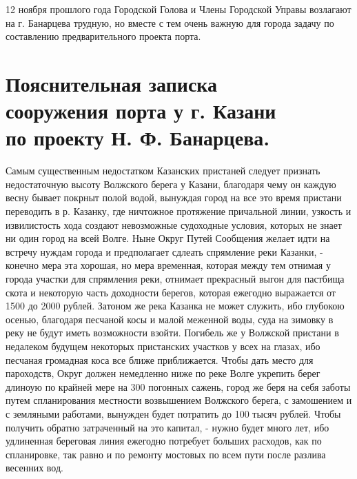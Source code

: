 \documentclass[oneside,final,14pt]{extreport}
\begin{document}
12 ноября прошлого года Городской Голова и Члены Городской Управы возлагают на г. Банарцева трудную, но вместе с тем очень важную для города задачу по составлению предварительного проекта порта.

\newpage

{%
	\centering
	\section*{Пояснительная записка \\сооружения порта у г. Казани\\по проекту Н. Ф. Банарцева.}
}

Самым существенным недостатком Казанских пристаней следует признать недостаточную высоту Волжского берега у Казани, благодаря чему он каждую весну бывает покрныт полой водой, вынуждая город на все это время пристани переводить в р. Казанку, где ничтожное протяжение причальной линии, узкость и извилистость хода создают невозможные судоходные условия, которых не знает ни один город на всей Волге. Ныне Округ Путей Сообщения желает идти на встречу нуждам города и предполагает сдлеать спрямление реки Казанки, - конечно мера эта хорошая, но мера временная, которая между тем отнимая у города участки для спрямления реки, отнимает прекрасный выгон для пастбища скота и некоторую часть доходности берегов, которая ежегодно выражается от 1500 до 2000 рублей. Затоном же река Казанка не может служить, ибо глубокою осенью, благодаря песчаной косы и малой меженной воды, суда на зимовку в реку не будут иметь возможности взойти. Погибель же у Волжской пристани в недалеком будущем некоторых пристанских участков у всех на глазах, ибо песчаная громадная коса все ближе приближается. Чтобы дать место для пароходств, Округ должен немедленно ниже по реке Волге укрепить берег длиноую по крайней мере на 300 погонных сажень, город же беря на себя заботы путем спланирования местности возвышением Волжского берега, с замошением и с земляными работами, вынужден будет потратить до 100 тысяч рублей. Чтобы получить обратно затраченный на это капитал, - нужно будет много лет, ибо удлиненная береговая линия ежегодно потребует больших расходов, как по спланировке, так равно и по ремонту мостовых по всем пути после разлива весенних вод.
\end{document}
